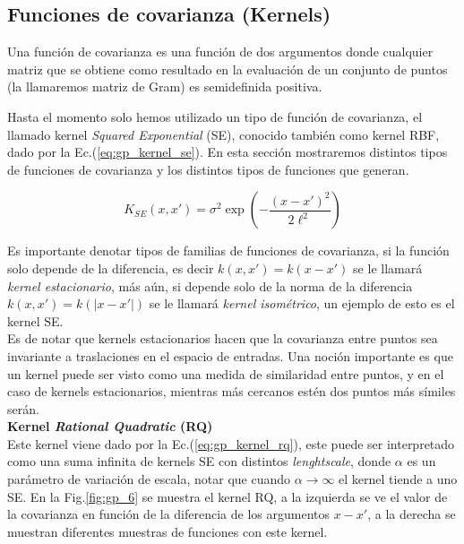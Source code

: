 \subsection{Funciones de covarianza (Kernels)}

Una función de covarianza es una función de dos argumentos donde cualquier matriz que se obtiene como resultado en la evaluación de un conjunto de puntos (la llamaremos matriz de Gram) es semidefinida positiva.

Hasta el momento solo hemos utilizado un tipo de función de covarianza, el llamado kernel \textit{Squared Exponential} (SE), conocido también como kernel RBF, dado por la Ec.(\ref{eq:gp_kernel_se}). En esta sección mostraremos distintos tipos de funciones de covarianza y los distintos tipos de funciones que generan.

\begin{equation}\label{eq:gp_kernel_se}
	K_{SE}(x, x') = \sigma^2 \exp\left( - \frac{\left( x- x'\right)^2}{2\ell^2} \right)
\end{equation}

Es importante denotar tipos de familias de funciones de covarianza, si la función solo depende de la diferencia, es decir $k(x, x')=k(x-x')$ se le llamará \textit{kernel estacionario}, más aún, si depende solo de la norma de la diferencia $k(x, x')=k(|x-x'|)$ se le llamará \textit{kernel isométrico}, un ejemplo de esto es el kernel SE.\\

Es de notar que kernels estacionarios hacen que la covarianza entre puntos sea invariante a traslaciones en el espacio de entradas. Una noción importante es que un kernel puede ser visto como una medida de similaridad entre puntos, y en el caso de kernels estacionarios, mientras más cercanos estén dos puntos más símiles serán.\\

\textbf{Kernel \textit{Rational Quadratic} (RQ)}\\

Este kernel viene dado por la Ec.(\ref{eq:gp_kernel_rq}), este puede ser interpretado como una suma infinita de kernels SE con distintos \textit{lenghtscale}, donde $\alpha$ es un parámetro de variación de escala, notar que cuando $\alpha \rightarrow \infty$ el kernel tiende a uno SE. En la Fig.\ref{fig:gp_6} se muestra el kernel RQ, a la izquierda se ve el valor de la covarianza en función de la diferencia de los argumentos $x-x'$, a la derecha se muestran diferentes muestras de funciones con este kernel.
 
